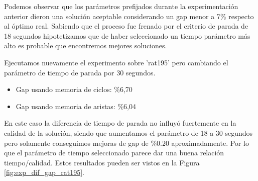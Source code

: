 \documentclass[10pt,a4paper]{article}
\begin{document}
Podemos observar que los parámetros prefijados durante la experimentación anterior dieron una solución aceptable considerando un gap menor a 7\% respecto al óptimo real.
Sabiendo que el proceso fue frenado por el criterio de parada de 18 segundos hipotetizamos que de haber seleccionado un tiempo parámetro más alto es probable que encontremos mejores soluciones.

Ejecutamos nuevamente el experimento sobre 'rat195' pero cambiando el parámetro de tiempo de parada por 30 segundos.
\begin{itemize}
    \item Gap usando memoria de ciclos: \%6,70
    \item Gap usando memoria de aristas: \%6,04
\end{itemize}

En este caso la diferencia de tiempo de parada no influyó fuertemente en la calidad de la solución, siendo que aumentamos el parámetro de 18 a 30 segundos pero solamente conseguimos mejoras de gap de \%0.20 aproximadamente. Por lo que el parámetro de tiempo seleccionado parece dar una buena relación tiempo/calidad. Estos resultados pueden ser vistos en la Figura \ref{fig:exp_dif_gap_rat195}.
\end{document}
